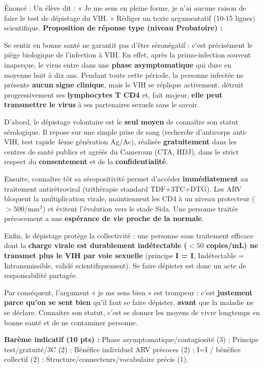 \documentclass[11pt]{article}
\begin{document}
\begin{exoresolu}
Énoncé : Un élève dit : « Je me sens en pleine forme, je n'ai aucune raison de faire le test de dépistage du VIH. » Rédiger un texte argumentatif (10-15 lignes) scientifique.
\tcblower
\textbf{Proposition de réponse type (niveau Probatoire) :}

Se sentir en bonne santé ne garantit pas d'être séronégatif : c'est précisément le piège biologique de l'infection à VIH. En effet, après la primo-infection souvent inaperçue, le virus entre dans une \textbf{phase asymptomatique} qui dure en moyenne huit à dix ans. Pendant toute cette période, la personne infectée ne présente \textbf{aucun signe clinique}, mais le VIH se réplique activement, détruit progressivement ses \textbf{lymphocytes T CD4} et, fait majeur, \textbf{elle peut transmettre le virus} à ses partenaires sexuels sans le savoir.

D'abord, le dépistage volontaire est le \textbf{seul moyen} de connaître son statut sérologique. Il repose sur une simple prise de sang (recherche d'anticorps anti-VIH, test rapide 4ème génération Ag/Ac), réalisée \textbf{gratuitement} dans les centres de santé publics et agréés du Cameroun (CTA, HDJ), dans le strict respect du \textbf{consentement} et de la \textbf{confidentialité}.

Ensuite, connaître tôt sa séropositivité permet d'accéder \textbf{immédiatement} au traitement antirétroviral (trithérapie standard TDF+3TC+DTG). Les ARV bloquent la multiplication virale, maintiennent les CD4 à un niveau protecteur ($> 500$/mm$^3$) et évitent l'évolution vers le stade Sida. Une personne traitée précocement a une \textbf{espérance de vie proche de la normale}.

Enfin, le dépistage protège la collectivité : une personne sous traitement efficace dont la \textbf{charge virale est durablement indétectable ($< 50$ copies/mL) ne transmet plus le VIH par voie sexuelle} (principe \textbf{I = I}, Indétectable = Intransmissible, validé scientifiquement). Se faire dépister est donc un acte de responsabilité partagée.

Par conséquent, l'argument « je me sens bien » est trompeur : c'est \textbf{justement parce qu'on se sent bien} qu'il faut se faire dépister, \textbf{avant} que la maladie ne se déclare. Connaître son statut, c'est se donner les moyens de vivre longtemps en bonne santé et de ne contaminer personne.

\textbf{Barème indicatif (10 pts) :} Phase asymptomatique/contagiosité (3) ; Principe test/gratuité/3C (2) ; Bénéfice individuel ARV précoces (2) ; I=I / bénéfice collectif (2) ; Structure/connecteurs/vocabulaire précis (1).
\end{exoresolu}
\end{document}
